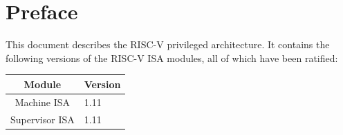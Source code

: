 \chapter{Preface}

This document describes the RISC-V privileged architecture.
It contains the following versions of the RISC-V ISA modules,
all of which have been ratified:

\bigskip

\begin{table}[hbt]
  \centering
  \begin{tabular}{|c|l|}
    \hline
    Module             & Version \\
    \hline
    Machine ISA    & 1.11 \\
    Supervisor ISA & 1.11 \\
    \hline
  \end{tabular}
\end{table}
